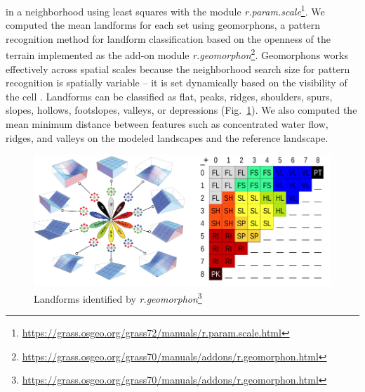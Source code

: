 \documentclass[prodmode,acmtochi]{acmsmall} %
\begin{document}
in a neighborhood using least squares \cite{Wood1996} 
with the module \textit{r.param.scale}\footnote{\url{https://grass.osgeo.org/grass72/manuals/r.param.scale.html}}. 
%
We computed the mean landforms for each set using geomorphons,
a pattern recognition method for landform classification 
based on the openness of the terrain
implemented as the add-on module \textit{r.geomorphon}\footnote{\url{https://grass.osgeo.org/grass70/manuals/addons/r.geomorphon.html}}. 
Geomorphons works effectively across spatial scales because 
the neighborhood search size for pattern recognition 
is spatially variable -- it is set dynamically based on the visibility of the cell \cite{Jasiewicz2013}.  
Landforms can be classified as flat, peaks, ridges, shoulders, spurs, slopes, hollows, footslopes, valleys, or depressions (Fig.~\ref{fig:geomorphons}).
%
We also computed the mean minimum distance between features 
such as concentrated water flow, ridges, and valleys
on the modeled landscapes and the reference landscape.

\begin{figure}[h!]
\begin{center}
		\includegraphics[width=\textwidth]{images/geomorphons_legend.png}
	\caption{Landforms identified by \textit{r.geomorphon}\footnote{\url{https://grass.osgeo.org/grass70/manuals/addons/r.geomorphon.html}}} %
	\label{fig:geomorphons}
\end{center}
\end{figure}
\end{document}
